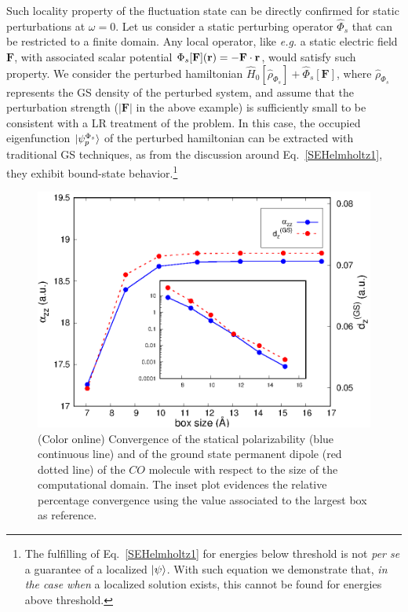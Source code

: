 \documentclass[reprint,aps,prb]{revtex4-1}
\renewcommand{\r}{{\bf r}}
\newcommand{\op}[1]{\hat {#1}}
\newcommand{\dm}{\op{\rho}}
\newcommand{\hnot}{\op{H}_0}
\begin{document}
Such locality property of the fluctuation state can be directly confirmed for static perturbations at $\omega=0$.
Let us consider a static perturbing operator $\op\Phi_s$ that can be restricted to a finite domain. 
Any local operator, like \emph{e.g.} a static electric field $\mathbf F$, with associated scalar potential $\Phi_s[\mathbf F](\r) = -\mathbf F \cdot \r$, would satisfy such property.
We consider the perturbed hamiltonian $\hnot[\dm_{\Phi_s}] + \op\Phi_s[\mathbf F]$, where $\dm_{\Phi_s}$ represents the GS density of the perturbed system, and assume that the 
perturbation strength ($|\mathbf F|$ in the above example) is sufficiently small to be consistent with a LR treatment of the problem. 
In this case, the occupied eigenfunction $\ket{\psi_p^{\Phi_s}}$ of the perturbed hamiltonian can be extracted with traditional GS techniques, 
as from the discussion around Eq.~\eqref{SEHelmholtz1}, they exhibit bound-state behavior.\footnote{The fulfilling of Eq.~\eqref{SEHelmholtz1} for energies below threshold
is not \textit{per se} a guarantee of a localized $\ket{\psi}$. With such equation we demonstrate that, \emph{in the case when} a localized
solution exists, this cannot be found for energies above threshold.}
\begin{figure}[t]
\includegraphics[scale=0.68]{CO_statPolvsBox.eps}
\caption{\label{co_alphaStatic}(Color online) Convergence of the statical polarizability (blue continuous line) and of the ground state permanent dipole (red dotted line) 
of the $CO$ molecule with respect to the size of the computational domain. The inset plot evidences the relative percentage convergence using the value associated to the largest 
box as reference.}
\end{figure}
\end{document}
